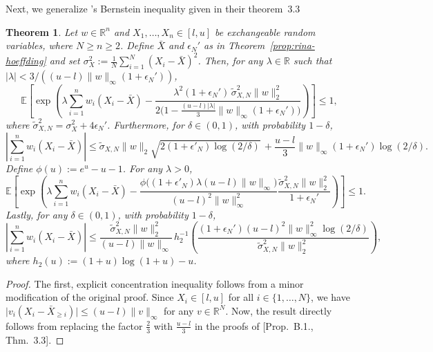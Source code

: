\documentclass[aos]{imsart2}
\theoremstyle{plain}
\newtheorem{theorem}{Theorem}[section]
\theoremstyle{definition}
\newcommand{\R}{\mathbb{R}}
\newcommand{\E}{\mathbb{E}}
\newcommand{\sigt}{\tilde{\sigma}}
\begin{document}
\begin{appendix}
Next, we generalize \cite{barber_hoeffding_2024}'s Bernstein inequality given in their theorem~3.3
\begin{theorem}\label{thm:rina-bernstein}
    Let $w \in \R^n$ and $X_1,\ldots,X_n \in [l,u]$ be exchangeable random variables, where $N \geq n \geq 2$. Define $\bar{X}$ and $\epsilon_N'$ as in Theorem~\ref{prop:rina-hoeffding} and set $\sigma_X^2:= \frac{1}{N}\sum_{i=1}^N(X_i-\bar{X})^2$. Then, for any $\lambda \in \R$ such that $\lvert \lambda \rvert < 3/((u-l)\lVert w \rVert_\infty (1+\epsilon_N'))$,
    \begin{equation*}
        \E\left[\exp\left(\lambda \sum_{i=1}^n w_i (X_i - \bar{X}) - \frac{\lambda^2(1+\epsilon_N')\,\sigt^2_{X,N} \lVert w\rVert_2^2}{2\big(1-\frac{(u-l)\lvert \lambda \rvert }{3} \lVert w\rVert_\infty (1+\epsilon_N')\big)} \right)\right] \leq 1,
    \end{equation*}
     where $\sigt_{X,N}^2 = \sigma^2_X+4\epsilon_N'$. Furthermore, for $\delta \in (0,1)$, with probability $1-\delta$,
    \begin{equation*}
        \left\vert\sum_{i=1}^n w_i (X_i - \bar{X})\right\vert \leq \sigt_{X,N} \lVert w\rVert_2 \sqrt{2(1+\epsilon'_N)\log(2/\delta)}\, + \frac{u-l}{3}\lVert w\rVert_\infty(1+\epsilon_N')\log(2/\delta).
    \end{equation*}
    Define $\phi(u) := e^u -u-1$. For any $\lambda >0$,
    \begin{equation*}
        \E\left[\exp\left(\lambda \sum_{i=1}^n w_i (X_i - \bar{X}) -  \frac{\phi\big((1+\epsilon'_N)\lambda(u-l)\lVert w \rVert_\infty\big)}{(u-l)^2\lVert w\rVert_\infty^2} \frac{\sigt^2_{X,N} \lVert w \rVert_2^2}{1+\epsilon_N'}\right)\right] \leq 1.
    \end{equation*}
    Lastly, for any $\delta \in (0,1)$, with probability $1-\delta$,
    \begin{equation*}
        \left\vert\sum_{i=1}^n w_i (X_i - \bar{X})\right\vert \leq \frac{\sigt^2_{X,N} \lVert w \rVert_2^2}{(u-l)\lVert w \rVert_\infty}\, h_2^{-1}\left(\frac{(1+\epsilon_N')(u-l)^2\lVert w\rVert^2_\infty\log(2/\delta)}{\sigt^2_{X,N}\lVert w \rVert_2^2}\right),
    \end{equation*}
    where $h_2(u) := (1+u)\log(1+u)-u$.
\end{theorem}

\begin{proof}
    The first, explicit concentration inequality follows from a minor modification of the original proof. Since $X_i \in [l,u]$ for all $i \in \{1,\ldots,N\}$, we have $\lvert v_i (X_i-\bar{X}_{\geq i})\rvert \leq (u-l) \lVert v \rVert_\infty$ for any $v \in \R^N$. Now, the result directly follows from replacing the factor $\frac{2}{3}$ with $\frac{u-l}{3}$ in the proofs of \cite{barber_hoeffding_2024}[Prop.~B.1., Thm.~3.3].


\end{proof}
\end{appendix}
\end{document}
